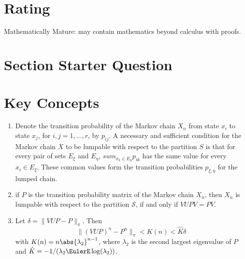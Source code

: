 \documentclass[12pt]{article}
\begin{document}
\myheader \mytitle

\hr


\hr

\usefirefox

\hr



\section*{Rating} %
Mathematically Mature:  may contain mathematics beyond calculus with
proofs. %

\hr

\section*{Section Starter Question}

\hr

\section*{Key Concepts}

\begin{enumerate}
    \item
        Denote the transition probability of the Markov chain \( X_n \)
        from state \( x_i \) to state \( x_j \), for \( i, j = 1, \dots,
        r \), by \( p_{ij} \).  A necessary and sufficient condition for
        the Markov chain \( X \) to be lumpable with respect to the
        partition \( S \) is that for every pair of sets \( E_{\xi} \)
        and \( E_{\eta} \), \( sum_{x_k \in E_{\eta}} p_{ik} \) has the
        same value for every \( x_i \in E_{\xi} \).  These common values
        form the transition probabilities \( p_{\xi, \eta} \) for the
        lumped chain.
    \item
        if \( P \) is the transition probability matrix of the Markov
        chain \( X_n \), then \( X_n \) is lumpable with respect to the
        partition \( \mathcal{S} \), if and only if \( VUPV = PV \).
    \item
        Let \( \delta = \| VUP - P \|_{\pi} \).  Then
        \[
            \| (VUP)^n - P^n \|_{\pi} < K(n) < \hat{K} \delta
        \] with \( K(n) = n \abs{\lambda_2}^{n-1} \), where \( \lambda_2
        \) is the second largest eigenvalue of \( P \) and \( \hat{K} =
        -1/(\lambda_2 \EulerE \log(\lambda_2)) \).
\end{enumerate}
\end{document}

